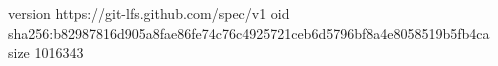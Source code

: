 version https://git-lfs.github.com/spec/v1
oid sha256:b82987816d905a8fae86fe74c76c4925721ceb6d5796bf8a4e8058519b5fb4ca
size 1016343
